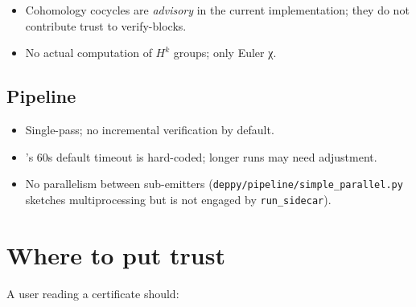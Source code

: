 \begin{itemize}[leftmargin=1.7em]
  \item Cohomology cocycles are \emph{advisory} in the current
    implementation; they do not contribute trust to verify-blocks.
  \item No actual computation of $H^k$ groups; only Euler χ.
\end{itemize}

\subsection{Pipeline}

\begin{itemize}[leftmargin=1.7em]
  \item Single-pass; no incremental verification by default.
  \item \Lean{}'s 60s default timeout is hard-coded; longer
    runs may need adjustment.
  \item No parallelism between sub-emitters
    (\texttt{deppy/pipeline/simple\_parallel.py} sketches
    multiprocessing but is not engaged by \texttt{run\_sidecar}).
\end{itemize}

\section{Where to put trust}

A user reading a \Deppy{} certificate should:

